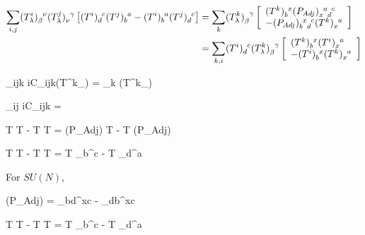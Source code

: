\begin{align}
\sum_{i,j}
(T_\lam^i)\indices{_\beta^\nu}
(T_\lam^j)\indices{_\nu^\gamma}
\left[
(T^i)\indices{_d^c}
(T^j)\indices{_b^a}
-
(T^i)\indices{_b^a}
(T^j)\indices{_d^c}
\right]
&=
\sum_k
(T^k_\lam)\indices{_\beta^\gamma}
\left[
\begin{array}{l}
(T^k)\indices{
	_b
	^x
}
(P_{Adj})\indices
{
_x
^a
_d
^c
}
\\
-
(P_{Adj})\indices{
_b
^x
_d
^c
}
(T^k)\indices{
	_x
	^a
}
\end{array}
\right]
\\
&=
\sum_{k,i}
(T^i)\indices{
_d^c
}
(T^k_\lam)\indices{_\beta^\gamma}
\left[
\begin{array}{l}
(T^k)\indices{
	_b
	^x
}
(T^i)\indices
{
_x
^a
}
\\
-
(T^i)\indices{
	_b
	^x
}
(T^k)\indices{
_x
^a
}
\end{array}
\right]
\end{align}





\beq
\sum_{ijk}
iC_{ijk}(T^k_\lam)
\indices{_\beta^\gamma}
=
\sum_k
(T^k_\lam)\indices{_\beta^\gamma}
\eeq

\beq
\sum_{ij}
iC_{ijk}
=
\eeq

\beq
T
T
-
T
T
=
(P_{Adj})
T
-
T
(P_{Adj})
\eeq

\beq
T
T
-
T
T
=
T
\delta_b^c
-
T
\delta_d^a
\eeq

For $SU(N)$,

\beq
(P_{Adj})
=
\delta_{bd}^{xc}
-
\delta_{db}^{xc}
\eeq

\beq
T
T
-
T
T
=
T
\delta_b^c
-
T
\delta_d^a
\eeq